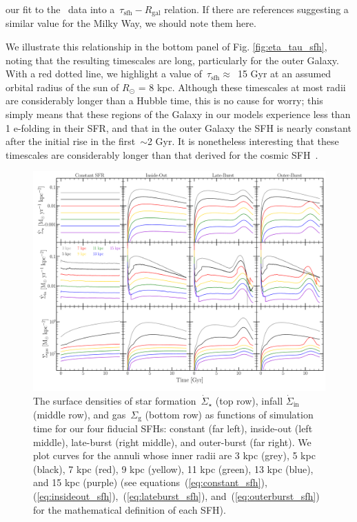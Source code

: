 \documentclass[fleqn, usenatbib]{mnras}
\newcommand{\refp}[1]{(\ref{#1})}
\begin{document}
our fit to the~\citet{Sanchez2020} data into a~$\tau_\text{sfh}-R_\text{gal}$ 
relation. {\color{red} If there are references suggesting a similar value for 
the Milky Way, we should note them here. } 
\par 
We illustrate this relationship in the bottom panel of Fig. 
\ref{fig:eta_tau_sfh}, noting that the resulting timescales are long, 
particularly for the outer Galaxy. With a red dotted line, we highlight a value 
of~$\tau_\text{sfh} \approx$~15 Gyr at an assumed orbital radius of the sun of 
$R_\odot$ = 8 kpc. Although these timescales at most radii are considerably 
longer than a Hubble time, this is no cause for worry; this simply means that 
these regions of the Galaxy in our models experience less than 1 e-folding in 
their SFR, and that in the outer Galaxy the SFH is nearly constant after the 
initial rise in the first~$\sim$2 Gyr. It is nonetheless interesting that 
these timescales are considerably longer than that derived for the cosmic 
SFH~\citep{Madau2014}. 

\begin{figure} 
\centering 
\includegraphics[scale = 0.32]{evol.pdf} 
\caption{The surface densities of star formation~$\dot{\Sigma}_\star$ (top 
row), infall $\dot{\Sigma}_\text{in}$ (middle row), and gas~$\Sigma_\text{g}$ 
(bottom row) as functions of simulation time for our four fiducial SFHs: 
constant (far left), inside-out (left middle), late-burst (right middle), and 
outer-burst (far right). We plot curves for the annuli whose inner radii are 
3 kpc (grey), 5 kpc (black), 7 kpc (red), 9 kpc (yellow), 11 kpc (green), 13 
kpc (blue), and 15 kpc (purple) (see equations~\refp{eq:constant_sfh}, 
\refp{eq:insideout_sfh},~\refp{eq:lateburst_sfh}, and~\refp{eq:outerburst_sfh} 
for the mathematical definition of each SFH). 
}
\label{fig:evol} 
\end{figure} 
\end{document}
